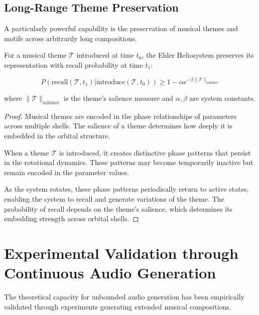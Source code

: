 \subsection{Long-Range Theme Preservation}

A particularly powerful capability is the preservation of musical themes and motifs across arbitrarily long compositions.

\begin{theorem}
For a musical theme $\mathcal{T}$ introduced at time $t_0$, the Elder Heliosystem preserves its representation with recall probability at time $t_1$:

\begin{equation}
P(\text{recall}(\mathcal{T}, t_1) | \text{introduce}(\mathcal{T}, t_0)) \geq 1 - \alpha e^{-\beta \|\mathcal{T}\|_{\text{salience}}}
\end{equation}

where $\|\mathcal{T}\|_{\text{salience}}$ is the theme's salience measure and $\alpha, \beta$ are system constants.
\end{theorem}

\begin{proof}
Musical themes are encoded in the phase relationships of parameters across multiple shells. The salience of a theme determines how deeply it is embedded in the orbital structure.

When a theme $\mathcal{T}$ is introduced, it creates distinctive phase patterns that persist in the rotational dynamics. These patterns may become temporarily inactive but remain encoded in the parameter values.

As the system rotates, these phase patterns periodically return to active states, enabling the system to recall and generate variations of the theme. The probability of recall depends on the theme's salience, which determines its embedding strength across orbital shells.
\end{proof}

\section{Experimental Validation through Continuous Audio Generation}

The theoretical capacity for unbounded audio generation has been empirically validated through experiments generating extended musical compositions.

